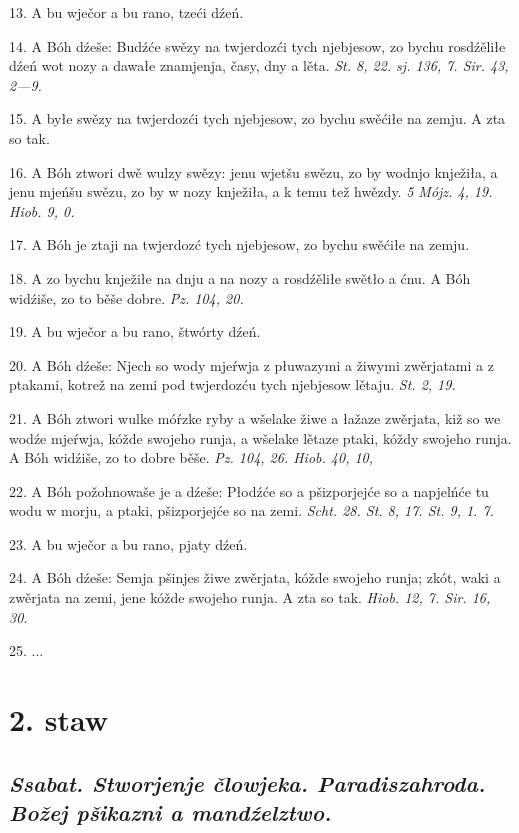 \documentclass[twocolumn,b5paper]{book}
\begin{document}
13. A bu wječor a bu rano, tzeći dźeń. 

14. A Bóh dźeše: Budźće swězy na twjerdozći tych njebjesow, zo bychu rosdźěliłe dźeń wot nozy a dawałe znamjenja, časy, dny a lěta. \hfill {\footnotesize \textit{St. 8, 22. sj. 136, 7. Sir. 43, 2—9.}} 

15. A byłe swězy na twjerdozći tych njebjesow, zo bychu swěćiłe na zemju. A zta so tak. 

16. A Bóh ztwori dwě wulzy swězy: jenu wjetšu swězu, zo by wodnjo knježiła, a jenu mjeńšu swězu, zo by w nozy knježiła, a k temu tež hwězdy. \hfill {\footnotesize \textit{5 Mójz. 4, 19. Hiob. 9, 0.}} 

17. A Bóh je ztaji na twjerdozć tych njebjesow, zo bychu swěćiłe na zemju. 

18. A zo bychu knježiłe na dnju a na nozy a rosdźěliłe swětło a ćnu. A Bóh widźiše, zo to běše dobre. \hfill {\footnotesize \textit{Pz. 104, 20.}}

19. A bu wječor a bu rano, štwórty dźeń. 

20. A Bóh dźeše: Njech so wody mjeŕwja z płuwazymi a žiwymi zwěrjatami a z ptakami, kotrež na zemi pod twjerdozću tych njebjesow lětaju. \hfill {\footnotesize \textit{St. 2, 19.}}

21. A Bóh ztwori wulke móŕzke ryby a wšelake žiwe a łažaze zwěrjata, kiž so we wodźe mjeŕwja, kóžde swojeho runja, a wšelake lětaze ptaki, kóždy swojeho runja. A Bóh widźiše, zo to dobre běše. \hfill {\footnotesize \textit{Pz. 104, 26. Hiob. 40, 10,}} 

22. A Bóh požohnowaše je a dźeše: Płodźće so a pšizporjejće so a napjelńće tu wodu w morju, a ptaki, pšizporjejće so na zemi. \hfill {\footnotesize \textit{Scht. 28. St. 8, 17. St. 9, 1. 7.}}

23. A bu wječor a bu rano, pjaty dźeń. 

24. A Bóh dźeše: Semja pšinjes žiwe zwěrjata, kóžde swojeho runja; zkót, waki a zwěrjata na zemi, jene kóžde swojeho runja. A zta so tak. \hfill {\footnotesize \textit{Hiob. 12, 7. Sir. 16, 30.}}

25. ... 

\section*{2. staw}

\subsection*{\textit{Ssabat. Stworjenje člowjeka. Paradiszahroda. Božej pšikazni a mandźelztwo.}} 
\end{document}
